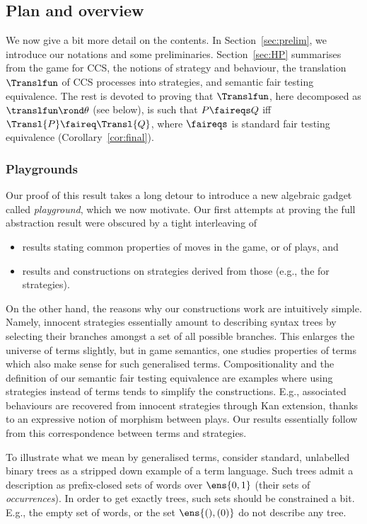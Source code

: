 \documentclass{LMCS}
\theoremstyle{plain}\newtheorem{satz}[thm]{Satz}
\begin{document}
\subsection{Plan and overview}\label{subsec:overview}
We now give a bit more detail on the contents.  In
Section~\ref{sec:prelim}, we introduce our notations and some
preliminaries.  Section~\ref{sec:HP} summarises from  the game for
CCS, the notions of strategy and behaviour, the translation
$\Translfun$ of CCS processes into strategies, and semantic fair
testing equivalence.  The rest is devoted to proving that
$\Translfun$, here decomposed as $\translfun \rond \theta$ (see
below), is such that $P \faireqs Q$ iff $\Transl{P} \faireq
\Transl{Q}$, where $\faireqs$ is standard fair testing
equivalence (Corollary~\ref{cor:final}).

\subsubsection{Playgrounds}
Our proof of this result takes a long detour to introduce a new
algebraic gadget called \emph{playground}, which we now motivate.  Our
first attempts at proving the full abstraction result were obscured by
a tight interleaving of
\begin{itemize}
\item results stating common properties of moves in the game, or of
  plays, and
\item results and constructions on strategies derived from those
  (e.g., the \lts{} for strategies).
\end{itemize}

On the other hand, the reasons why our constructions work are
intuitively simple.  Namely, innocent strategies essentially amount to
describing syntax trees by selecting their branches amongst a set of
all possible branches. This enlarges the universe of terms slightly,
but in game semantics, one studies properties of terms which also make
sense for such generalised terms.  Compositionality and the definition
of our semantic fair testing equivalence are examples where using
strategies instead of terms tends to simplify the constructions. E.g.,
associated behaviours are recovered from innocent strategies through
Kan extension, thanks to an expressive notion of morphism between
plays.  Our results essentially follow from this correspondence
between terms and strategies.

\begin{exa}
  To illustrate what we mean by generalised terms, consider standard,
  unlabelled binary trees as a stripped down example of a term
  language.  Such trees admit a description as prefix-closed sets of
  words over $\ens{0,1}$ (their sets of \emph{occurrences}). In order
  to get exactly trees, such sets should be constrained a bit. E.g.,
  the empty set of words, or the set $\ens{(),(0)}$ do not describe
  any tree.
\end{exa}
\end{document}
